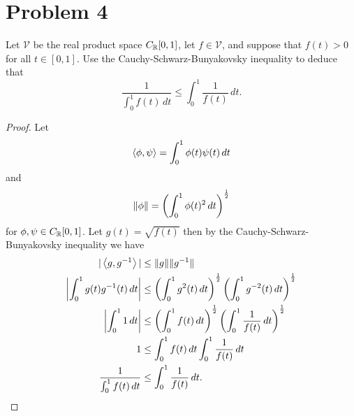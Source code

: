 \documentclass[12pt]{article}
\begin{document}
\section*{Problem 4}
Let $\mathcal{V}$ be the real product space $C_{\mathbb{R}}[0, 1]$, let $f \in \mathcal{V}$, and suppose that $f (t) > 0$ for all $t \in [0, 1]$. Use the Cauchy-Schwarz-Bunyakovsky inequality to deduce that
\[
    \frac{1}{\int_{0}^{1}f(t)\,dt}\leq\int_{0}^{1}\frac{1}{f(t)}\,dt.
\]
\begin{proof}
    Let
    \[
        \left\langle \phi, \psi \right\rangle=\int_{0}^{1}\phi(t)\psi(t)\,dt
    \]
    and
    \[
        \| \phi \|=\left(\int_{0}^{1}\phi(t)^2\,dt\right)^{\frac{1}{2}}
    \]
    for $\phi,\psi\in C_{\mathbb{R}}[0, 1]$. Let $g(t)=\sqrt{f(t)}$ then by the Cauchy-Schwarz-Bunyakovsky inequality we have
    \begin{align*}
        |\left\langle g, g^{-1} \right\rangle|&\leq\| g \|\| g^{-1} \|\\
        \left|\int_{0}^{1}g(t)g^{-1}(t)\,dt\right|&\leq\left(\int_{0}^{1}g^2(t)\,dt\right)^{\frac{1}{2}}\left(\int_{0}^{1}g^{-2}(t)\,dt\right)^{\frac{1}{2}}\\
        \left|\int_{0}^{1}1\,dt\right| &\leq\left(\int_{0}^{1}f(t)\,dt\right)^{\frac{1}{2}}\left(\int_{0}^{1}\frac{1}{f(t)}\,dt\right)^{\frac{1}{2}}\\
        1&\leq\int_{0}^{1}f(t)\,dt\int_{0}^{1}\frac{1}{f(t)}\,dt\\
        \frac{1}{\int_{0}^{1}f(t)\,dt}&\leq\int_{0}^{1}\frac{1}{f(t)}\,dt.\qedhere
    \end{align*} 
\end{proof}
\end{document}
